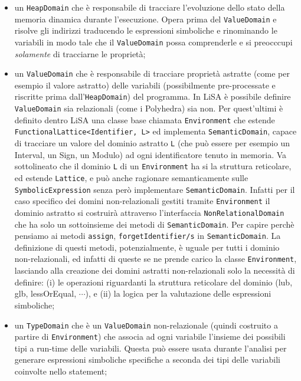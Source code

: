 \begin{itemize}
\setlength\itemsep{0.1em}
    \item un \texttt{HeapDomain} che è responsabile di tracciare l'evoluzione dello stato della memoria dinamica durante l'esecuzione. Opera prima del \texttt{ValueDomain} e risolve gli indirizzi traducendo le espressioni simboliche e rinominando le variabili in modo tale che il \texttt{ValueDomain} possa comprenderle e si preocccupi \textit{solamente} di tracciarne le proprietà;
    
    \item un \texttt{ValueDomain} che è responsabile di tracciare proprietà astratte (come per esempio il valore astratto) delle variabili (possibilmente pre-processate e riscritte prima dall'\texttt{HeapDomain}) del programma. In LiSA è possibile definire \texttt{ValueDomain} sia relazionali (come i Polyhedra) sia non. Per quest'ultimi è definito dentro LiSA una classe base chiamata \texttt{Environment} che estende  \texttt{FunctionalLattice<Identifier, L>} ed implementa \texttt{SemanticDomain}, capace di tracciare un valore del dominio astratto \texttt{L} (che può essere per esempio un Interval, un Sign, un Modulo) ad ogni identificatore tenuto in memoria. Va sottolineato che il dominio \texttt{L} di un \texttt{Environment} ha si la struttura reticolare, ed estende \texttt{Lattice}, e può anche ragionare semanticamente sulle \texttt{SymbolicExpression} senza però implementare \texttt{SemanticDomain}. Infatti per il caso specifico dei domini non-relazionali gestiti tramite \texttt{Environment} il dominio astratto si costruirà attraverso l'interfaccia \texttt{NonRelationalDomain} che ha solo un sottoinsieme dei metodi di \texttt{SemanticDomain}. Per capire perchè pensiamo ai metodi \texttt{assign}, \texttt{forgetIdentifier/s} in \texttt{SemanticDomain}. La definizione di questi metodi, potenzialmente, è uguale per tutti i dominio non-relazionali, ed infatti di queste se ne prende carico la classe \texttt{Environment}, lasciando alla creazione dei domini astratti non-relazionali solo la necessità di definire: (i) le operazioni riguardanti la struttura reticolare del dominio (lub, glb, lessOrEqual, \(\cdots\)), e (ii) la logica per la valutazione delle espressioni simboliche;
    
    \item un \texttt{TypeDomain} che è un \texttt{ValueDomain} non-relazionale (quindi costruito a partire di \texttt{Environment}) che associa ad ogni variabile l'insieme dei possibili tipi a run-time delle variabili. Questa può essere usata durante l'analisi per generare espressioni simboliche specifiche a seconda dei tipi delle variabili coinvolte nello statement;
\end{itemize}

